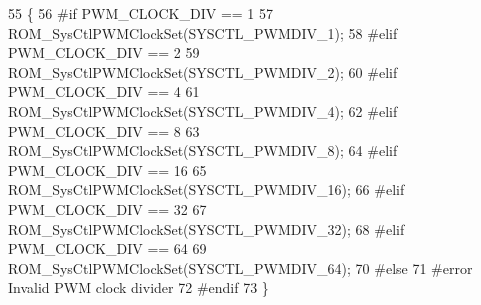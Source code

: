\begin{DoxyCode}
55                               \{
56 \textcolor{preprocessor}{#if PWM\_CLOCK\_DIV == 1}
57     ROM\_SysCtlPWMClockSet(SYSCTL\_PWMDIV\_1);
58 \textcolor{preprocessor}{#elif PWM\_CLOCK\_DIV == 2}
59     ROM\_SysCtlPWMClockSet(SYSCTL\_PWMDIV\_2);
60 \textcolor{preprocessor}{#elif PWM\_CLOCK\_DIV == 4}
61     ROM\_SysCtlPWMClockSet(SYSCTL\_PWMDIV\_4);
62 \textcolor{preprocessor}{#elif PWM\_CLOCK\_DIV == 8}
63     ROM\_SysCtlPWMClockSet(SYSCTL\_PWMDIV\_8);
64 \textcolor{preprocessor}{#elif PWM\_CLOCK\_DIV == 16}
65     ROM\_SysCtlPWMClockSet(SYSCTL\_PWMDIV\_16);
66 \textcolor{preprocessor}{#elif PWM\_CLOCK\_DIV == 32}
67     ROM\_SysCtlPWMClockSet(SYSCTL\_PWMDIV\_32);
68 \textcolor{preprocessor}{#elif PWM\_CLOCK\_DIV == 64}
69     ROM\_SysCtlPWMClockSet(SYSCTL\_PWMDIV\_64);
70 \textcolor{preprocessor}{#else}
71 \textcolor{preprocessor}{#error Invalid PWM clock divider}
72 \textcolor{preprocessor}{#endif}
73 \}
\end{DoxyCode}
